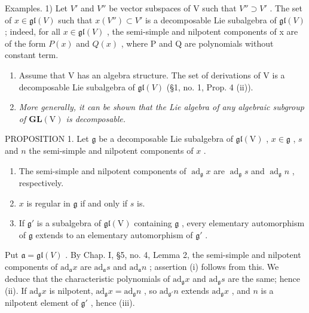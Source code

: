 Examples. 1) Let \(V'\) and \(V''\) be vector subspaces of V such that \(V'' \supset V'\) . The set of \(x \in \mathfrak{gl}(V)\) such that \(x(V'') \subset V'\) is a decomposable Lie subalgebra of \(\mathfrak{gl}(V)\) ; indeed, for all \(x \in \mathfrak{gl}(V)\) , the semi-simple and nilpotent components of x are of the form \(P(x)\) and \(Q(x)\) , where P and Q are polynomials without constant term.

\begin{enumerate}
\def\labelenumi{\arabic{enumi})}
\setcounter{enumi}{1}
\item
  Assume that V has an algebra structure. The set of derivations of V is a decomposable Lie subalgebra of \(\mathfrak{gl}(V)\) (§1, no. 1, Prop. 4 (ii)).
\item
  \emph{More generally, it can be shown that the Lie algebra of any algebraic subgroup of \(\mathbf{GL}(\mathrm{V})\) is decomposable.}
\end{enumerate}

PROPOSITION 1. Let \(\mathfrak{g}\) be a decomposable Lie subalgebra of \(\mathfrak{gl}(\mathrm{V})\) , \(x \in \mathfrak{g}\) , \(s\) and \(n\) the semi-simple and nilpotent components of \(x\) .

\begin{enumerate}
\def\labelenumi{(\roman{enumi})}
\item
  The semi-simple and nilpotent components of \(\operatorname{ad}_{\mathfrak{g}}x\) are \(\operatorname{ad}_{\mathfrak{g}}s\) and \(\operatorname{ad}_{\mathfrak{g}}n\) , respectively.
\item
  \(x\) is regular in \(\mathfrak{g}\) if and only if \(s\) is.
\item
  If \(\mathfrak{g}'\) is a subalgebra of \(\mathfrak{gl}(\mathrm{V})\) containing \(\mathfrak{g}\) , every elementary automorphism of \(\mathfrak{g}\) extends to an elementary automorphism of \(\mathfrak{g}'\) .
\end{enumerate}

Put \(\mathfrak{a} = \mathfrak{gl}(V)\) . By Chap. I, §5, no. 4, Lemma 2, the semi-simple and nilpotent components of \(\mathrm{ad}_{\mathfrak{a}}x\) are \(\mathrm{ad}_{\mathfrak{a}}s\) and \(\mathrm{ad}_{\mathfrak{a}}n\) ; assertion (i) follows from this. We deduce that the characteristic polynomials of \(\mathrm{ad}_{\mathfrak{g}}x\) and \(\mathrm{ad}_{\mathfrak{g}}s\) are the same; hence (ii). If \(\mathrm{ad}_{\mathfrak{g}}x\) is nilpotent, \(\mathrm{ad}_{\mathfrak{g}}x = \mathrm{ad}_{\mathfrak{g}}n\) , so \(\mathrm{ad}_{\mathfrak{g}'}n\) extends \(\mathrm{ad}_{\mathfrak{g}}x\) , and \(n\) is a nilpotent element of \(\mathfrak{g}'\) , hence (iii).


